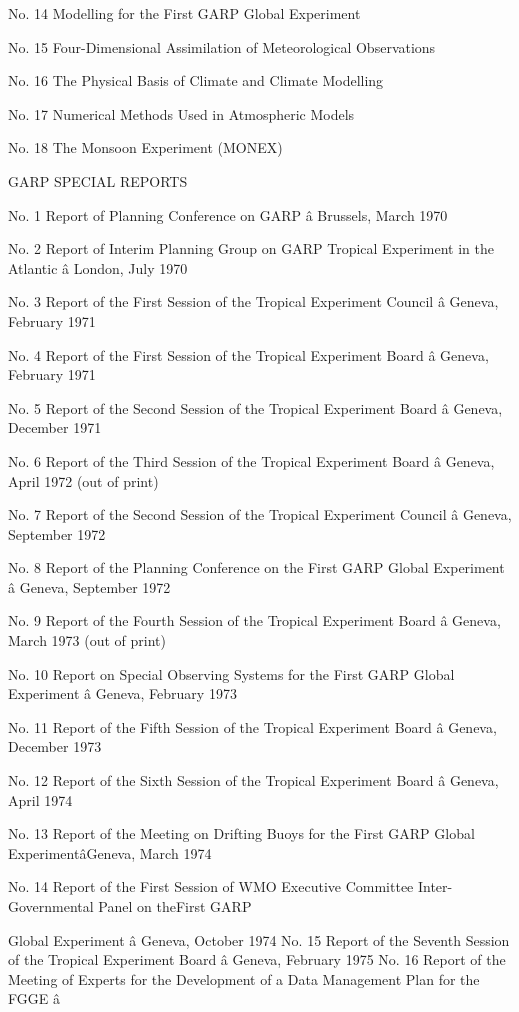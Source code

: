 No. 14 Modelling for the First GARP Global Experiment

No. 15 Four-Dimensional Assimilation of Meteorological Observations

No. 16 The Physical Basis of Climate and Climate Modelling

No. 17 Numerical Methods Used in Atmospheric Models

No. 18 The Monsoon Experiment (MONEX)

GARP SPECIAL REPORTS

No. 1 Report of Planning Conference on GARP â Brussels, March 1970

No. 2 Report of Interim Planning Group on GARP Tropical Experiment in
the Atlantic â London, July 1970

No. 3 Report of the First Session of the Tropical Experiment Council â
Geneva, February 1971

No. 4 Report of the First Session of the Tropical Experiment Board â
Geneva, February 1971

No. 5 Report of the Second Session of the Tropical Experiment Board â
Geneva, December 1971

No. 6 Report of the Third Session of the Tropical Experiment Board â
Geneva, April 1972 (out of print)

No. 7 Report of the Second Session of the Tropical Experiment Council â
Geneva, September 1972

No. 8 Report of the Planning Conference on the First GARP Global
Experiment â Geneva, September 1972

No. 9 Report of the Fourth Session of the Tropical Experiment Board â
Geneva, March 1973 (out of print)

No. 10 Report on Special Observing Systems for the First GARP Global
Experiment â Geneva, February 1973

No. 11 Report of the Fifth Session of the Tropical Experiment Board â
Geneva, December 1973

No. 12 Report of the Sixth Session of the Tropical Experiment Board â
Geneva, April 1974

No. 13 Report of the Meeting on Drifting Buoys for the First GARP Global
ExperimentâGeneva, March 1974

No. 14 Report of the First Session of WMO Executive Committee
Inter-Governmental Panel on the\textquotesingle First GARP

Global Experiment â Geneva, October 1974 No. 15 Report of the Seventh
Session of the Tropical Experiment Board â Geneva, February 1975 No. 16
Report of the Meeting of Experts for the Development of a Data
Management Plan for the FGGE â

